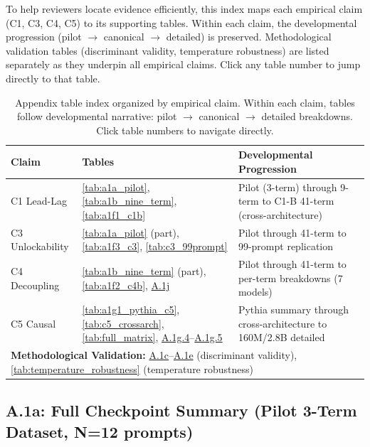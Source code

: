 \documentclass[10pt]{article} %
\begin{document}
\noindent To help reviewers locate evidence efficiently, this index maps each empirical claim (C1, C3, C4, C5) to its supporting tables. Within each claim, the developmental progression (pilot $\to$ canonical $\to$ detailed) is preserved. Methodological validation tables (discriminant validity, temperature robustness) are listed separately as they underpin all empirical claims. Click any table number to jump directly to that table.

\begin{table}[h]
\centering
\small
\begin{tabular}{|l|l|p{8cm}|}
\hline
\textbf{Claim} & \textbf{Tables} & \textbf{Developmental Progression} \\
\hline
C1 Lead-Lag & \ref{tab:a1a_pilot}, \ref{tab:a1b_nine_term}, \ref{tab:a1f1_c1b} & Pilot (3-term) through 9-term to C1-B 41-term (cross-architecture) \\
C3 Unlockability & \ref{tab:a1a_pilot} (part), \ref{tab:a1f3_c3}, \ref{tab:c3_99prompt} & Pilot through 41-term to 99-prompt replication \\
C4 Decoupling & \ref{tab:a1b_nine_term} (part), \ref{tab:a1f2_c4b}, \hyperref[sec:a1j_c4b]{A.1j} & Pilot through 41-term to per-term breakdowns (7 models) \\
C5 Causal & \ref{tab:a1g1_pythia_c5}, \ref{tab:c5_crossarch}, \ref{tab:full_matrix}, \hyperref[sec:a1g4_160m]{A.1g.4}--\hyperref[sec:a1g5_2b8]{A.1g.5} & Pythia summary through cross-architecture to 160M/2.8B detailed \\
\hline
\multicolumn{3}{|l|}{\textbf{Methodological Validation:} \hyperref[sec:a1c_v1v2]{A.1c}--\hyperref[sec:a1e_v4]{A.1e} (discriminant validity), \ref{tab:temperature_robustness} (temperature robustness)} \\
\hline
\end{tabular}
\caption{Appendix table index organized by empirical claim. Within each claim, tables follow developmental narrative: pilot $\to$ canonical $\to$ detailed breakdowns. Click table numbers to navigate directly.}
\label{tab:appendix_index}
\end{table}

\subsection*{A.1a: Full Checkpoint Summary (Pilot 3-Term Dataset, N=12 prompts)}
\end{document}
